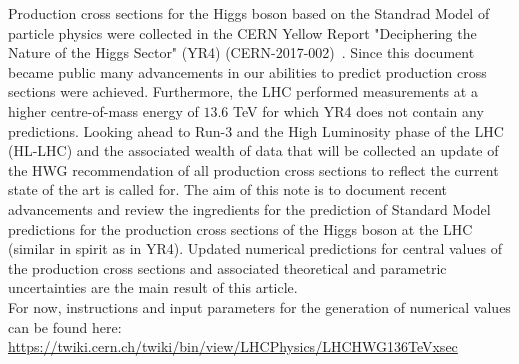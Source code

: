 \renewcommand*{\thefootnote}{\arabic{footnote}}
\setcounter{footnote}{0}
\setcounter{page}{1}
Production cross sections for the Higgs boson based on the Standrad Model of particle physics were collected in the CERN Yellow Report "Deciphering the Nature of the Higgs Sector" (YR4) (CERN-2017-002)~\cite{LHCHiggsCrossSectionWorkingGroup:2016ypw}.  
Since this document became public many advancements in our abilities to predict production cross sections were achieved. 
Furthermore, the LHC performed measurements at a higher centre-of-mass energy of $13.6$ TeV for which YR4 does not contain any predictions.
Looking ahead to Run-3 and the High Luminosity phase of the LHC  (HL-LHC) and the associated wealth of data that will be collected an update of the HWG recommendation of all production cross sections to reflect the current state of the art is called for.
The aim of this note is to document recent advancements and review the ingredients for the prediction of Standard Model predictions for the production cross sections of the Higgs boson at the LHC (similar in spirit as in YR4). 
Updated numerical predictions for central values of the production cross sections and associated theoretical and parametric uncertainties are the main result of this article. 
\\
For now, instructions and input parameters for the generation of numerical values can be found here:  \url{https://twiki.cern.ch/twiki/bin/view/LHCPhysics/LHCHWG136TeVxsec}